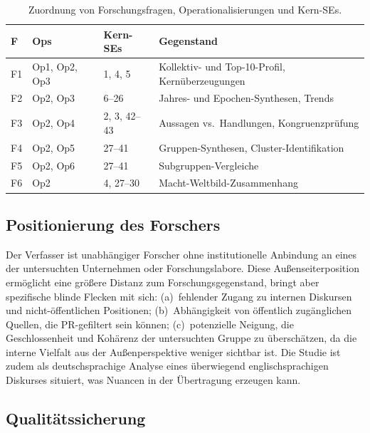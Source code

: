 \documentclass[12pt,a4paper]{article}
\begin{document}
\begin{table}[htbp]
  \centering
  \caption{Zuordnung von Forschungsfragen, Operationalisierungen und Kern-SEs.}
  \label{tab:zuordnung}
  \footnotesize
  \begin{tabularx}{\textwidth}{l l l Y}
    \toprule
    \textbf{F} & \textbf{Ops} & \textbf{Kern-SEs} & \textbf{Gegenstand} \\
    \midrule
    F1 & Op1, Op2, Op3 & 1, 4, 5 & Kollektiv- und Top-10-Profil, Kernüberzeugungen \\
    \addlinespace[2pt]
    F2 & Op2, Op3 & 6--26 & Jahres- und Epochen-Synthesen, Trends \\
    \addlinespace[2pt]
    F3 & Op2, Op4 & 2, 3, 42--43 & Aussagen vs.\ Handlungen, Kongruenzprüfung \\
    \addlinespace[2pt]
    F4 & Op2, Op5 & 27--41 & Gruppen-Synthesen, Cluster-Identifikation \\
    \addlinespace[2pt]
    F5 & Op2, Op6 & 27--41 & Subgruppen-Vergleiche \\
    \addlinespace[2pt]
    F6 & Op2 & 4, 27--30 & Macht-Weltbild-Zusammenhang \\
    \bottomrule
  \end{tabularx}
\end{table}


\subsection{Positionierung des Forschers}
\label{sec:methodik:positionierung}

Der Verfasser ist unabhängiger Forscher ohne institutionelle Anbindung an eines der untersuchten Unternehmen oder Forschungslabore. Diese Außenseiterposition ermöglicht eine größere Distanz zum Forschungsgegenstand, bringt aber spezifische blinde Flecken mit sich: (a)~fehlender Zugang zu internen Diskursen und nicht-öffentlichen Positionen; (b)~Abhängigkeit von öffentlich zugänglichen Quellen, die PR-gefiltert sein können; (c)~potenzielle Neigung, die Geschlossenheit und Kohärenz der untersuchten Gruppe zu überschätzen, da die interne Vielfalt aus der Außenperspektive weniger sichtbar ist. Die Studie ist zudem als deutschsprachige Analyse eines überwiegend englischsprachigen Diskurses situiert, was Nuancen in der Übertragung erzeugen kann.

\subsection{Qualitätssicherung}
\label{sec:methodik:qualitaet}
\end{document}
